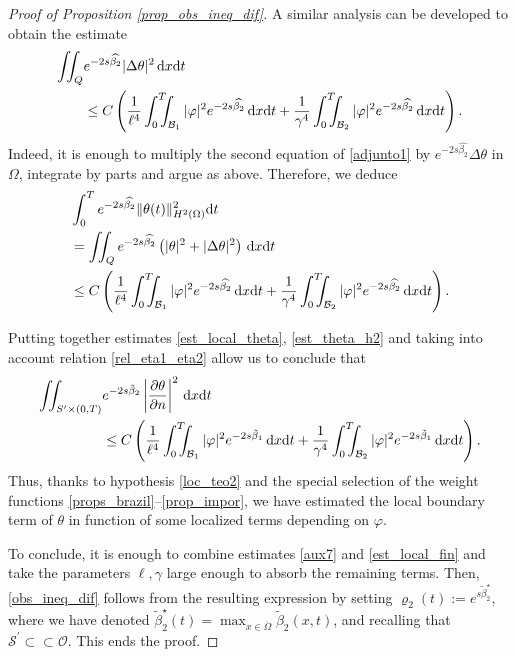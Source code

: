 \documentclass{dcds-bOF}
\theoremstyle{definition}
\def\dx{\,\textnormal{d}x}
\def\dt{\textnormal{d}t}
\begin{document}
\begin{proof}[Proof of Proposition \ref{prop_obs_ineq_dif}]
A similar analysis can be developed to obtain the estimate
%
\begin{equation}\label{aux10}
\begin{split}
\iint_{Q} &e^{-2s\widehat{\beta_2}}|\Delta\theta|^2\dx\dt\\
&\leq C\left(\frac{1}{\ell^4}\int_0^T\!\!\!\!\int_{\mathcal B_1}|\varphi|^2e^{-2s\widehat{\beta_2}}\dx\dt+\frac{1}{\gamma^4}\int_0^T\!\!\!\!\int_{\mathcal B_2}|\varphi|^2e^{-2s\widehat{\beta_2}}\dx\dt\right).
\end{split}
\end{equation}
%
Indeed, it is enough to multiply the second equation of \eqref{adjunto1} by $e^{-2s\widehat{\beta_2}}\Delta\theta$ in $\Omega$, integrate by parts and argue as above. Therefore, we deduce
%
\begin{align}\notag
&\int_{0}^Te^{-2s\widehat{\beta_2}}\|\theta(t)\|_{H^2(\Omega)}^2\dt\\\notag&=\iint_{Q}e^{-2s\widehat{\beta_2}}\left(|\theta|^2+
|\Delta \theta|^2\right)\dx\dt \\ \label{est_theta_h2}
&\leq C\left(\frac{1}{\ell^4}\int_0^T\!\!\!\!\int_{\mathcal B_1}|\varphi|^2e^{-2s\widehat{\beta_2}}\dx\dt+\frac{1}{\gamma^4}\int_0^T\!\!\!\!\int_{\mathcal B_2}|\varphi|^2e^{-2s\widehat{\beta_2}}\dx\dt\right).
\end{align}
%

Putting together estimates \eqref{est_local_theta}, \eqref{est_theta_h2} and taking into account relation \eqref{rel_eta1_eta2} allow us to conclude that
%
\begin{equation}\label{est_local_fin}
\begin{split}
\iint_{S^{\prime}\times(0,T)}&e^{-2s\tilde\beta_2}\left|\frac{\partial \theta}{\partial n}\right|^2\dx\dt \\
& \leq C\left(\frac{1}{\ell^4}\int_0^T\!\!\!\!\int_{\mathcal B_1}|\varphi|^2e^{-2s\tilde{\beta}_1}\dx\dt+\frac{1}{\gamma^4}\int_0^T\!\!\!\!\int_{\mathcal B_2}|\varphi|^2e^{-2s\tilde{\beta}_1}\dx\dt\right).
\end{split}
\end{equation}
%
Thus, thanks to hypothesis \eqref{loc_teo2} and the special selection of the weight functions \eqref{props_brazil}--\eqref{prop_impor}, we have estimated the local boundary term of $\theta$ in function of some localized terms depending on $\varphi$.

To conclude, it is enough to combine estimates \eqref{aux7} and \eqref{est_local_fin} and take the parameters $\ell,\gamma$ large enough to absorb the remaining terms. Then, \eqref{obs_ineq_dif} follows from the resulting expression by setting $\varrho_2(t):=e^{s\tilde\beta_2^\star}$, where we have denoted $\tilde{\beta}_2^\star(t)=\max_{x\in\overline{\Omega}}\tilde\beta_2(x,t)$, and recalling that $\mathcal S^\prime\subset\subset \mathcal O$.  This ends the proof.
%
\end{proof}
\end{document}
